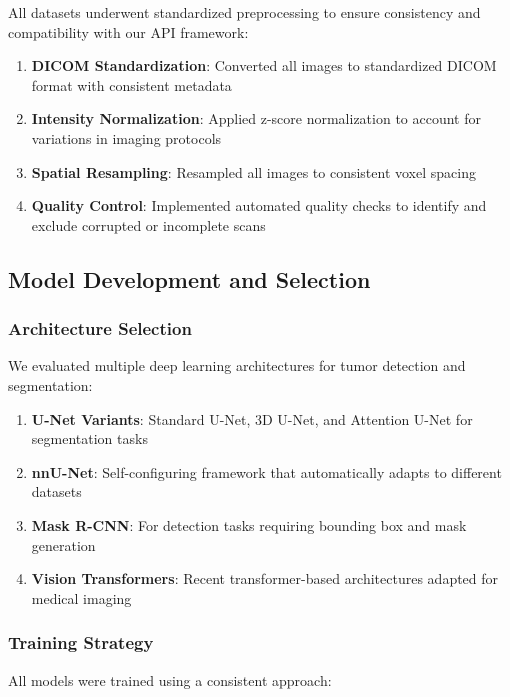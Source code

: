\documentclass[12pt,a4paper]{article}
\begin{document}
All datasets underwent standardized preprocessing to ensure consistency and compatibility with our API framework:

\begin{enumerate}
    \item \textbf{DICOM Standardization}: Converted all images to standardized DICOM format with consistent metadata
    \item \textbf{Intensity Normalization}: Applied z-score normalization to account for variations in imaging protocols
    \item \textbf{Spatial Resampling}: Resampled all images to consistent voxel spacing
    \item \textbf{Quality Control}: Implemented automated quality checks to identify and exclude corrupted or incomplete scans
\end{enumerate}

\subsection{Model Development and Selection}

\subsubsection{Architecture Selection}

We evaluated multiple deep learning architectures for tumor detection and segmentation:

\begin{enumerate}
    \item \textbf{U-Net Variants}: Standard U-Net, 3D U-Net, and Attention U-Net for segmentation tasks
    \item \textbf{nnU-Net}: Self-configuring framework that automatically adapts to different datasets \cite{isensee2021nnunet}
    \item \textbf{Mask R-CNN}: For detection tasks requiring bounding box and mask generation
    \item \textbf{Vision Transformers}: Recent transformer-based architectures adapted for medical imaging
\end{enumerate}

\subsubsection{Training Strategy}

All models were trained using a consistent approach:
\end{document}
